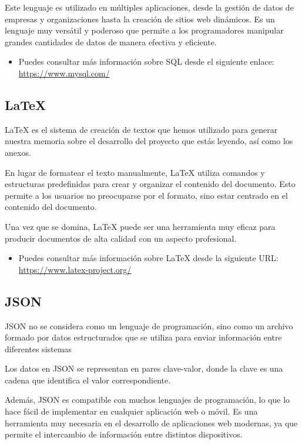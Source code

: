 Este lenguaje es utilizado en múltiples aplicaciones, desde la gestión de datos de empresas y organizaciones hasta la creación de sitios web dinámicos. Es un lenguaje muy versátil y poderoso que permite a los programadores manipular grandes cantidades de datos de manera efectiva y eficiente. 

\begin{itemize}
    \item Puedes consultar más información sobre SQL desde el siguiente enlace: \url{https://www.mysql.com/}
\end{itemize}


\subsection{LaTeX} \label{LATEX}

LaTeX es el sistema de creación de textos que hemos utilizado para generar nuestra memoria sobre el desarrollo del proyecto que estás leyendo, así como los anexos.

En lugar de formatear el texto manualmente, LaTeX utiliza comandos y estructuras predefinidas para crear y organizar el contenido del documento. Esto permite a los usuarios 
no preocuparse por el formato, sino estar centrado en el contenido del documento.

Una vez que se domina, LaTeX puede ser una herramienta muy eficaz para producir documentos de alta calidad con un aspecto profesional.

\begin{itemize}
    \item Puedes consultar más información sobre LaTeX desde la siguiente URL: \url{https://www.latex-project.org/}
\end{itemize}

\subsection{JSON} \label{JSON}
JSON no se considera como un lenguaje de programación, sino como un archivo formado por datos estructurados que se utiliza para enviar información entre diferentes sistemas

Los datos en JSON se representan en pares clave-valor, donde la clave es una cadena que identifica el valor correspondiente.

Además, JSON es compatible con muchos lenguajes de programación, lo que lo hace fácil de implementar en cualquier aplicación web o móvil. Es una herramienta muy necesaria en el desarrollo de aplicaciones web modernas, ya que permite el intercambio de información entre distintos dispositivos.

